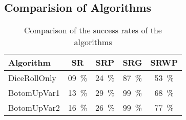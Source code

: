 \pagebreak
\subsection{Comparision of Algorithms}

\begin{table}[H]
	\centering
	\begin{tabular}{ | l | c |c |c |c | }
		\hline
		Algorithm 		& SR 	& SRP 	& SRG 	& SRWP   	\\ \hline
		\hline
		DiceRollOnly 	& 09~\%	& 24~\% & 87~\% & 53~\%		\\ \hline
		BotomUpVar1 	& 13~\% & 29~\% & 99~\% & 68~\% 	\\ \hline
		BotomUpVar2 	& 16~\% & 26~\% & 99~\% & 77~\% 	\\ \hline
	\end{tabular}
	\caption{Comparison of the success rates of the algorithms}
	\label{comparisonAlgorithms}
\end{table}

\pagebreak